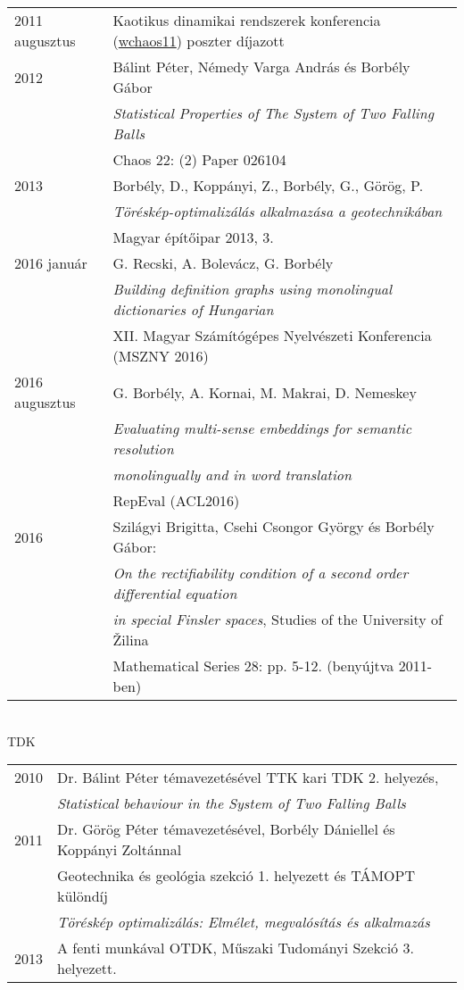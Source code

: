 \documentclass[12pt]{article}
\begin{document}
        \begin{tabular}{p{3cm}l}
	       2011 augusztus & Kaotikus dinamikai rendszerek konferencia (\href{http://www.mpipks-dresden.mpg.de/~wchaos11/}{wchaos11}) poszter díjazott %
		   \\
			2012 & Bálint Péter, Némedy Varga András és Borbély Gábor\\
                & \emph{Statistical Properties of The System of Two Falling Balls} \\
                & Chaos 22: (2) Paper 026104
			\\
			2013 & Borbély, D., Koppányi, Z., Borbély, G., Görög, P.\\
                & \emph{Töréskép-optimalizálás alkalmazása a geotechnikában} \\
                & Magyar építőipar 2013, 3.
            \\
            2016 január & G. Recski, A. Bolevácz, G. Borbély \\
            & \emph{Building definition graphs using monolingual dictionaries of Hungarian} \\
            & XII. Magyar Számítógépes Nyelvészeti Konferencia (MSZNY 2016)
            \\
            2016 augusztus & G. Borbély, A. Kornai, M. Makrai, D. Nemeskey \\
                & \emph{Evaluating multi-sense embeddings for semantic resolution} \\
                & \emph{monolingually and in word translation} \\
                & RepEval (ACL2016) \\
            2016& Szilágyi Brigitta, Csehi Csongor György és Borbély Gábor:\\
                & \emph{On the rectifiability condition of a second order differential equation}\\
                & \emph{in special Finsler spaces}, Studies of the University of Žilina \\
                & Mathematical Series 28: pp. 5-12. (benyújtva 2011-ben)
       \end{tabular}
 \newpage
 { \ }\\ 
  \textsc{TDK}
 \vspace{0.3cm}
 \\
        \begin{tabular}{p{3cm}l}
		2010& Dr. Bálint Péter témavezetésével TTK kari TDK 2. helyezés, \\
            & \emph{Statistical behaviour in the
System of Two Falling Balls}\\
		2011& Dr. Görög Péter témavezetésével, Borbély Dániellel és Koppányi Zoltánnal\\
            & Geotechnika és geológia szekció 1. helyezett és TÁMOPT különdíj\\
            & \emph{Töréskép optimalizálás: Elmélet, megvalósítás és alkalmazás}\\
        2013& A fenti munkával OTDK, Műszaki Tudományi Szekció 3. helyezett.
       \end{tabular}
\end{document}

